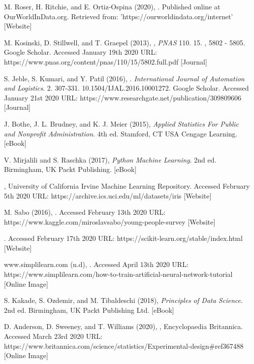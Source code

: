 \documentclass[a4paper, 12pt]{article}
\begin{document}
\newpage
\begin{thebibliography}{99}

M. Roser, H. Ritchie, and E. Ortiz-Ospina (2020),
. Published online at OurWorldInData.org. Retrieved from: 'https://ourworldindata.org/internet' [Website]

M. Kosinski, D. Stillwell, and T. Graepel (2013),
, \textit{PNAS} 110. 15. , 5802 - 5805. Google Scholar. Accessed January 19th 2020 URL: https://www.pnas.org/content/pnas/110/15/5802.full.pdf [Journal]

S. Jeble, S. Kumari, and Y. Patil (2016),
. \textit{International Journal of Automation and Logistics}. 2. 307-331. 10.1504/IJAL.2016.10001272. Google Scholar. Accessed January 21st 2020 URL: https://www.researchgate.net/publication/309809606 [Journal]

J. Bothe, J. L. Brudney, and K. J. Meier (2015), 
\textit{Applied Statistics For Public and Nonprofit Administration}. 4th ed. Stamford, CT USA Cengage Learning. [eBook]

V. Mirjalili and S. Raschka (2017),
\textit{Python Machine Learning}. 2nd ed. Birmingham, UK Packt Publishing. [eBook]

, University of California Irvine Machine Learning Repository. Accessed February 5th 2020 URL: https://archive.ics.uci.edu/ml/datasets/iris [Website]

M. Sabo (2016), . Accessed February 13th 2020 URL: https://www.kaggle.com/miroslavsabo/young-people-survey [Website]

. Accessed February 17th 2020 URL: https://scikit-learn.org/stable/index.html [Website]

www.simplilearn.com (n.d),
. Accessed April 13th 2020 URL: https://www.simplilearn.com/how-to-train-artificial-neural-network-tutorial [Online Image]

S. Kakade, S. Ozdemir, and M. Tibaldeschi (2018),
\textit{Principles of Data Science}. 2nd ed. Birmingham, UK Packt Publishing Ltd. [eBook]

D. Anderson, D. Sweeney, and T. Williams (2020),
, Encyclopaedia Britannica. Accessed March 23rd 2020 
URL: https://www.britannica.com/science/statistics/Experimental-design\#ref367488 [Online Image]


\end{thebibliography}
\end{document}

